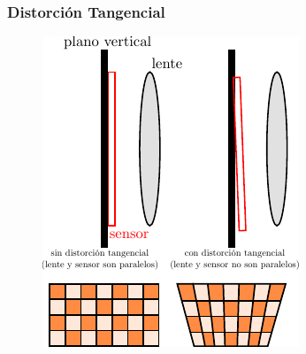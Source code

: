     

\begin{frame}
    \frametitle{Distorción Tangencial}
    \footnotesize
    \begin{figure}
        \includegraphics[width=0.4\columnwidth]{images/camera/tangential_distortion2.pdf}\\
    \end{figure}
    
\end{frame}

